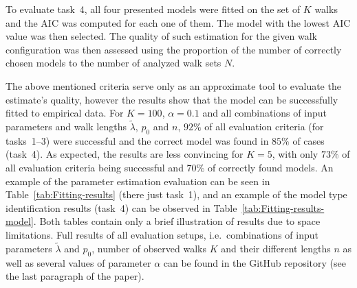 To evaluate task~4, all four presented models were fitted on the set of $K$ walks and the AIC was computed for each one of them.
The model with the lowest AIC value was then selected.
The quality of such estimation for the given walk configuration was then assessed using the proportion of the number of correctly chosen models to the number of analyzed walk sets $N$.

The above mentioned criteria serve only as an approximate tool to evaluate the estimate's quality, however the results show that the model can be successfully fitted to empirical data.
For $K=100$, $\alpha=0.1$ and all combinations of input parameters and walk lengths $\tilde{\lambda}$, $p_0$ and $n$, $92\%$ of all evaluation criteria (for tasks~1--3) were successful and the correct model was found in $85\%$ of cases (task~4).
As expected, the results are less convincing for $K=5$, with only $73\%$ of all evaluation criteria being successful and $70\%$ of correctly found models.
An example of the parameter estimation evaluation can be seen in Table~\ref{tab:Fitting-results} (there just task~1), and an example of the model type identification results (task~4) can be observed in Table~\ref{tab:Fitting-results-model}.
Both tables contain only a brief illustration of results due to space limitations.
Full results of all evaluation setups, i.e.~combinations of input parameters $\tilde{\lambda}$ and $p_0$, number of observed walks $K$ and their different lengths $n$ as well as several values of parameter $\alpha$ can be found in the GitHub repository (see the last paragraph of the paper).

